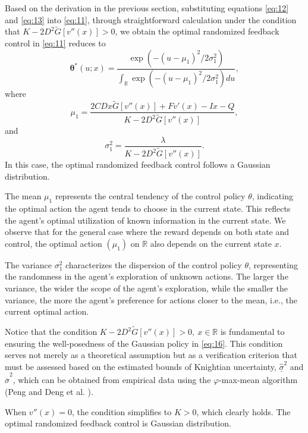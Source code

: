 \documentclass[onecolumn, journal]{IEEEtran} %
\begin{document}
	Based on the derivation in the previous section, substituting equations \eqref{eq:12} and \eqref{eq:13} into \eqref{eq:11}, through straightforward calculation under the condition that $K - 2D^2\widetilde{G}[v''(x)] > 0$, we obtain the optimal randomized feedback control in \eqref{eq:11} reduces to
	\begin{equation}\label{eq:16}
		\tag{16}
		\boldsymbol{\theta}^*(u; x) = \frac{\exp \left( - \left( u -  \mu_1 \right)^2 \big/ {2\sigma_1^2} \right)}{\int_{\mathbb{R}} \exp \left( - \left( u - \mu_1  \right)^2 \big/ {2\sigma_1^2} \right) du},
	\end{equation}
	where
	\[
	\mu_1 = \frac{2CDx\widetilde{G}[v''(x)] + Fv'(x) -Ix- Q}{K - 2D^2\widetilde{G}[v''(x)]},
	\]
	and
	\[
	\sigma_1^2 = \frac{\lambda}{K - 2D^2\widetilde{G}[v''(x)]}.
	\] 
	In this case, the optimal randomized feedback control follows a Gaussian distribution.
	
	The mean \( \mu_1 \) represents the central tendency of the control policy \( \theta \), indicating the optimal action the agent tends to choose in the current state. This reflects the agent's optimal utilization of known information in the current state. We observe that for the general case where the reward depends on both state and control, the optimal action $(\mu_1)$ on $\mathbb{R}$ also depends on the current state $x$.
	
	The variance \( \sigma_1^2 \) characterizes the dispersion of the control policy \( \theta \), representing the randomness in the agent's exploration of unknown actions. The larger the variance, the wider the scope of the agent's exploration, while the smaller the variance, the more the agent's preference for actions closer to the mean, i.e., the current optimal action.
	
	Notice that the condition \( K - 2D^2 \widetilde{G}[v''(x)] > 0,\ x \in \mathbb{R} \) is fundamental to ensuring the well-posedness of the Gaussian policy in \eqref{eq:16}. This condition serves not merely as a theoretical assumption but as a verification criterion that must be assessed based on the estimated bounds of Knightian uncertainty, $\hat{\underline\sigma}^2$ and $\hat{\overline\sigma}^2$, which can be obtained from empirical data using the $\varphi$-max-mean algorithm (Peng \cite{peng2017} and Deng et al. \cite{deng2019}).
	
	When $v''(x) = 0$, the condition simplifies to $ K > 0 $, which clearly holds. The optimal randomized feedback control is Gaussian distribution.
	
\end{document}
